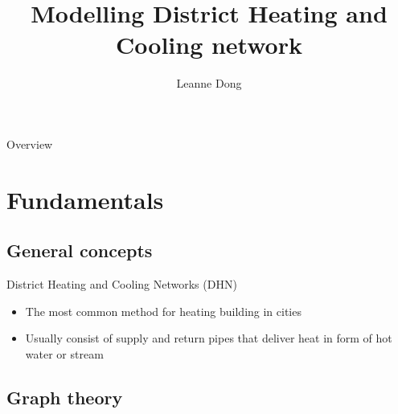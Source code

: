 \documentclass[xcolor=dvipsnames]{beamer}
\title{Modelling District Heating and Cooling network}
\author{Leanne Dong}
\begin{document}
\begin{frame}
\titlepage
\end{frame}
\begin{frame}{Overview}
\tableofcontents
\end{frame}


\section{Fundamentals}

\subsection{General concepts}
\begin{frame}{District Heating and Cooling Networks (DHN)}
\begin{itemize}
	\item The most common method for heating building in cities
	\item Usually consist of supply and return pipes that deliver heat in form of hot water or stream
\end{itemize}
\end{frame}

\subsection{Graph theory}
\end{document}

